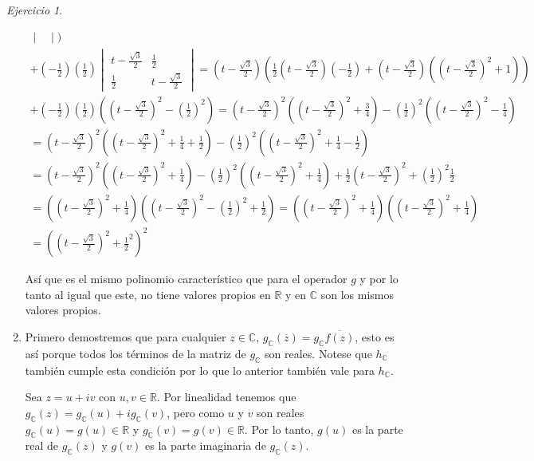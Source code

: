 \documentclass[11pt,a4paper]{article}
\theoremstyle{definition}
\theoremstyle{remark}
\newtheorem{exc}{Ejercicio}
\begin{document}
\begin{exc}
\begin{enumerate}
\begin{multline}
\begin{vmatrix}
		 		    	    	 		     		    \end{vmatrix})\\
		 		 +(-\frac{1}{2})(\frac{1}{2})\begin{vmatrix}
		 		  		    	    	t-\frac{\sqrt{3}}{2} & \frac{1}{2}
		 		  		    	    	\\ \frac{1}{2} &  t-\frac{\sqrt{3}}{2}
		 		  		    	    	\end{vmatrix} = (t-\frac{\sqrt{3}}{2})(\frac{1}{2}(t-\frac{\sqrt{3}}{2})(-\frac{1}{2})+(t-\frac{\sqrt{3}}{2})((t-\frac{\sqrt{3}}{2})^2+1))\\
		 		+(-\frac{1}{2})(\frac{1}{2})((t-\frac{\sqrt{3}}{2})^2-(\frac{1}{2})^2)= (t-\frac{\sqrt{3}}{2})^2((t-\frac{\sqrt{3}}{2})^2+\frac{3}{4})-(\frac{1}{2})^2 ((t-\frac{\sqrt{3}}{2})^2-\frac{1}{4})\\
		 		=(t-\frac{\sqrt{3}}{2})^2((t-\frac{\sqrt{3}}{2})^2+\frac{1}{4}+\frac{1}{2})-(\frac{1}{2})^2 ((t-\frac{\sqrt{3}}{2})^2+\frac{1}{4}-\frac{1}{2})
		 		\\ = (t-\frac{\sqrt{3}}{2})^2((t-\frac{\sqrt{3}}{2})^2+\frac{1}{4})-(\frac{1}{2})^2 ((t-\frac{\sqrt{3}}{2})^2+\frac{1}{4})+\frac{1}{2}(t-\frac{\sqrt{3}}{2})^2+(\frac{1}{2})^2\frac{1}{2}
		 		\\ = ((t-\frac{\sqrt{3}}{2})^2+\frac{1}{4})((t-\frac{\sqrt{3}}{2})^2-(\frac{1}{2})^2+\frac{1}{2})=((t-\frac{\sqrt{3}}{2})^2+\frac{1}{4})((t-\frac{\sqrt{3}}{2})^2+\frac{1}{4}) \\
		 		=((t-\frac{\sqrt{3}}{2})^2+\frac{1}{2}^2)^2\end{multline}
		 		
		 		Así que es el mismo polinomio característico que para el operador $ g $ y por lo tanto al igual que este, no tiene valores propios en $ \mathbb{R} $ y en $ \mathbb{C} $ son los mismos valores propios.
		 		
		 		\item 
		 		
		 		Primero demostremos que para cualquier $ z \in \mathbb{C} $, $ g_\mathbb{C}(\overline{z})=g_\mathbb{C}\overline{f(z)} $, esto es así porque todos los términos de la matriz de $ g_\mathbb{C} $ son reales. Notese que $ h_\mathbb{C} $ también cumple esta condición por lo que lo anterior también vale para $ h_\mathbb{C} $.
		 		
		 		Sea $ z = u+iv $ con $ u,v \in \mathbb{R} $. Por linealidad tenemos que $ g_\mathbb{C}(z)=g_\mathbb{C}(u)+ig_\mathbb{C}(v) $, pero como $ u $ y $ v $ son reales $ g_\mathbb{C}(u) = g(u) \in \mathbb{R} $ y $ g_\mathbb{C}(v) = g(v) \in \mathbb{R} $. Por lo tanto, $ g(u) $ es la parte real de $ g_\mathbb{C}(z) $ y $ g(v) $ es la parte imaginaria de $ g_\mathbb{C}(z) $.
		 		

\end{enumerate}
\end{exc}
\end{document}
